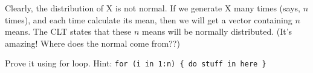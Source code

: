 \documentclass{article}\usepackage[]{graphicx}\usepackage[]{color}
\newenvironment{knitrout}{}{} %
\begin{document}
\begin{enumerate}
\begin{knitrout}
\end{knitrout}

Clearly, the distribution of X is not normal. If we generate X many times (says, $n$ times), and each time calculate its mean, then we will get a vector containing $n$ means. The CLT states that these $n$ means will be normally distributed. (It's amazing! Where does the normal come from??)

Prove it using for loop. Hint: \verb`for (i in 1:n) { do stuff in here }`

\end{enumerate}
\end{document}
